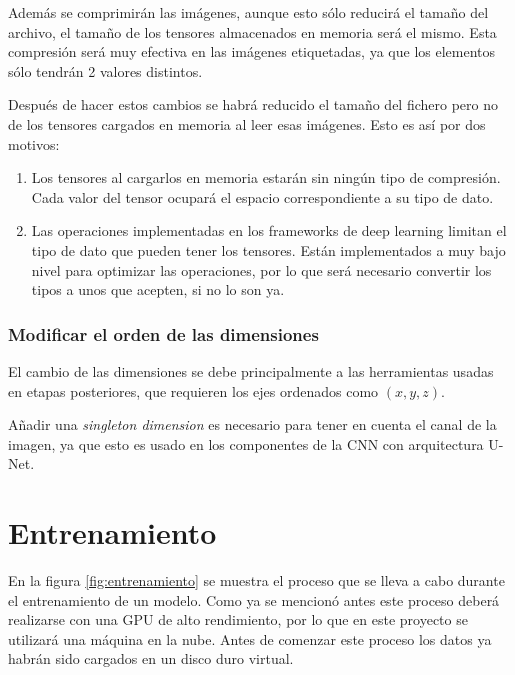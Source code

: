 Además se comprimirán las imágenes, aunque esto sólo reducirá el tamaño del archivo, el tamaño de los tensores almacenados en memoria será el mismo. Esta compresión será muy efectiva en las imágenes etiquetadas, ya que los elementos sólo tendrán 2 valores distintos. 

Después de hacer estos cambios se habrá reducido el tamaño del fichero pero no de los tensores cargados en memoria al leer esas imágenes. Esto es así por dos motivos:
\begin{enumerate}
\item Los tensores al cargarlos en memoria estarán sin ningún tipo de compresión. Cada valor del tensor ocupará el espacio correspondiente a su tipo de dato.
\item Las operaciones implementadas en los frameworks de deep learning limitan el tipo de dato que pueden tener los tensores. Están implementados a muy bajo nivel para optimizar las operaciones, por lo que será necesario  convertir los tipos a unos que acepten, si no lo son ya.
\end{enumerate}

\subsubsection{Modificar el orden de las dimensiones}

El cambio de las dimensiones se debe principalmente a las herramientas usadas en etapas posteriores, que requieren los ejes ordenados como $(x,y,z)$.

Añadir una \textit{singleton dimension} es necesario para tener en cuenta el canal de la imagen, ya que esto es usado en los componentes de la CNN con arquitectura U-Net.

\pagebreak \section{Entrenamiento}\label{sec:entrenamiento}


En la figura \ref{fig:entrenamiento} se muestra el proceso que se lleva a cabo durante el entrenamiento de un modelo. Como ya se mencionó antes este proceso deberá realizarse con una GPU de alto rendimiento, por lo que en este proyecto se utilizará una máquina en la nube. Antes de comenzar este proceso los datos ya habrán sido cargados en un disco duro virtual.

